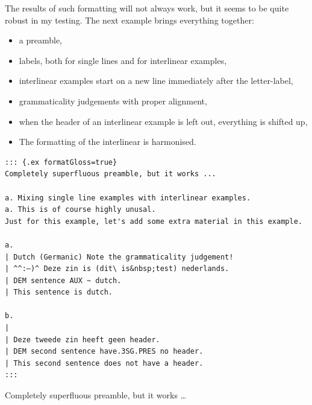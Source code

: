 \documentclass[
]{article}
\providecommand{\tightlist}{%
  \setlength{\itemsep}{0pt}\setlength{\parskip}{0pt}}
\begin{document}
The results of such formatting will not always work, but it seems to be
quite robust in my testing. The next example brings everything together:

\begin{itemize}
\tightlist
\item
  a preamble,
\item
  labels, both for single lines and for interlinear examples,
\item
  interlinear examples start on a new line immediately after the
  letter-label,
\item
  grammaticality judgements with proper alignment,
\item
  when the header of an interlinear example is left out, everything is
  shifted up,
\item
  The formatting of the interlinear is harmonised.
\end{itemize}

\begin{verbatim}
::: {.ex formatGloss=true}
Completely superfluous preamble, but it works ...

a. Mixing single line examples with interlinear examples.
a. This is of course highly unusal.
Just for this example, let's add some extra material in this example.

a.
| Dutch (Germanic) Note the grammaticality judgement!
| ^^:–)^ Deze zin is (dit\ is&nbsp;test) nederlands.
| DEM sentence AUX ~ dutch.
| This sentence is dutch.

b.
|
| Deze tweede zin heeft geen header.
| DEM second sentence have.3SG.PRES no header.
| This second sentence does not have a header.
:::
\end{verbatim}

\begin{samepage}
\begin{exe} 
  \ex Completely superfluous preamble, but it works \ldots{}
  \begin{xlist}
  \end{xlist}
  \label{ex:4.11}
\end{exe}
\end{samepage}
\end{document}
